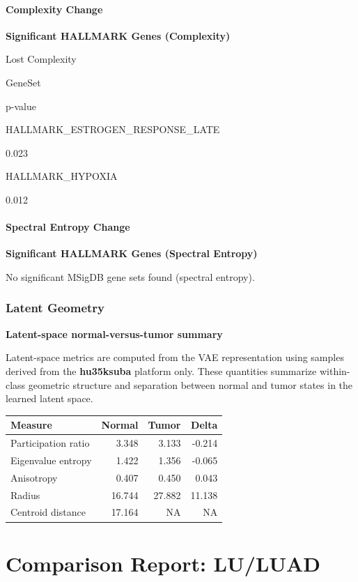 \documentclass[
  letterpaper,
  DIV=11,
  numbers=noendperiod,
  openany,
  oneside]{scrreprt}
\begin{document}
\subsubsection{Complexity Change}

\textbf{Significant HALLMARK Genes (Complexity)}

Lost Complexity

GeneSet

p-value

HALLMARK\_ESTROGEN\_RESPONSE\_LATE

0.023

HALLMARK\_HYPOXIA

0.012

\subsubsection{Spectral Entropy Change}

\textbf{Significant HALLMARK Genes (Spectral Entropy)}

No significant MSigDB gene sets found (spectral entropy).

\subsection{Latent Geometry}

\textbf{Latent-space normal-versus-tumor summary}

Latent-space metrics are computed from the VAE representation using
samples derived from the \textbf{hu35ksuba} platform only. These
quantities summarize within-class geometric structure and separation
between normal and tumor states in the learned latent space.

\begin{longtable}[]{@{}lrrr@{}}
\toprule\noalign{}
Measure & Normal & Tumor & Delta \\
\midrule\noalign{}
\endhead
\bottomrule\noalign{}
\endlastfoot
Participation ratio & 3.348 & 3.133 & -0.214 \\
Eigenvalue entropy & 1.422 & 1.356 & -0.065 \\
Anisotropy & 0.407 & 0.450 & 0.043 \\
Radius & 16.744 & 27.882 & 11.138 \\
Centroid distance & 17.164 & NA & NA \\
\end{longtable}

\chapter{Comparison Report: LU/LUAD}\label{comparison-report-luluad}
\end{document}
